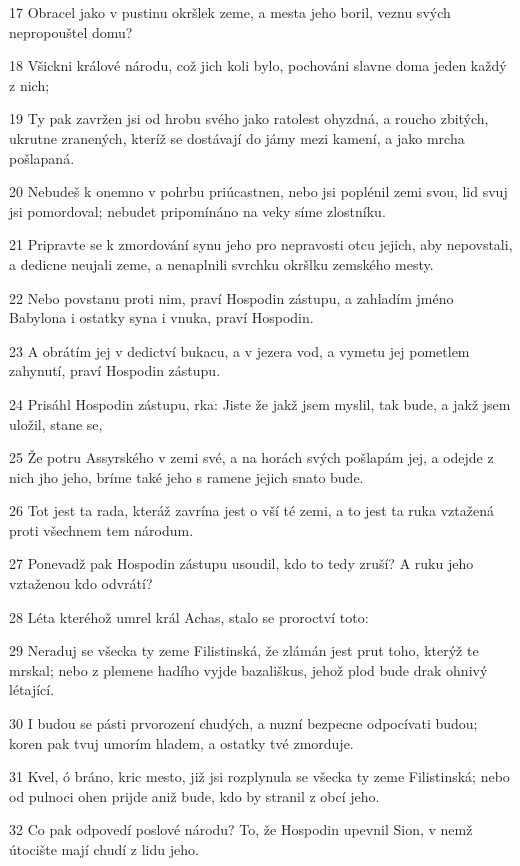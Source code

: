 \par 17 Obracel jako v pustinu okršlek zeme, a mesta jeho boril, veznu svých nepropouštel domu?
\par 18 Všickni králové národu, což jich koli bylo, pochováni slavne doma jeden každý z nich;
\par 19 Ty pak zavržen jsi od hrobu svého jako ratolest ohyzdná, a roucho zbitých, ukrutne zranených, kteríž se dostávají do jámy mezi kamení, a jako mrcha pošlapaná.
\par 20 Nebudeš k onemno v pohrbu priúcastnen, nebo jsi poplénil zemi svou, lid svuj jsi pomordoval; nebudet pripomínáno na veky síme zlostníku.
\par 21 Pripravte se k zmordování synu jeho pro nepravosti otcu jejich, aby nepovstali, a dedicne neujali zeme, a nenaplnili svrchku okršlku zemského mesty.
\par 22 Nebo povstanu proti nim, praví Hospodin zástupu, a zahladím jméno Babylona i ostatky syna i vnuka, praví Hospodin.
\par 23 A obrátím jej v dedictví bukacu, a v jezera vod, a vymetu jej pometlem zahynutí, praví Hospodin zástupu.
\par 24 Prisáhl Hospodin zástupu, rka: Jiste že jakž jsem myslil, tak bude, a jakž jsem uložil, stane se,
\par 25 Že potru Assyrského v zemi své, a na horách svých pošlapám jej, a odejde z nich jho jeho, bríme také jeho s ramene jejich snato bude.
\par 26 Tot jest ta rada, kteráž zavrína jest o vší té zemi, a to jest ta ruka vztažená proti všechnem tem národum.
\par 27 Ponevadž pak Hospodin zástupu usoudil, kdo to tedy zruší? A ruku jeho vztaženou kdo odvrátí?
\par 28 Léta kteréhož umrel král Achas, stalo se proroctví toto:
\par 29 Neraduj se všecka ty zeme Filistinská, že zlámán jest prut toho, kterýž te mrskal; nebo z plemene hadího vyjde bazališkus, jehož plod bude drak ohnivý létající.
\par 30 I budou se pásti prvorození chudých, a nuzní bezpecne odpocívati budou; koren pak tvuj umorím hladem, a ostatky tvé zmorduje.
\par 31 Kvel, ó bráno, kric mesto, již jsi rozplynula se všecka ty zeme Filistinská; nebo od pulnoci ohen prijde aniž bude, kdo by stranil z obcí jeho.
\par 32 Co pak odpovedí poslové národu? To, že Hospodin upevnil Sion, v nemž útocište mají chudí z lidu jeho.

